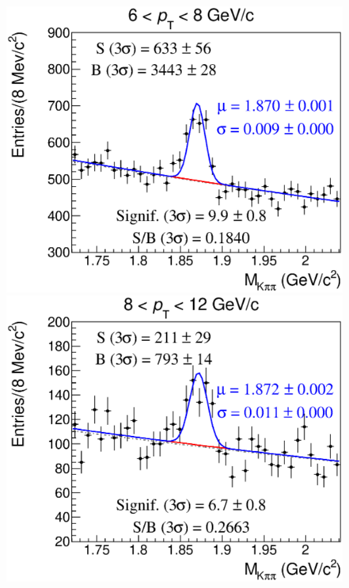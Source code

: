 \documentclass[b5paper,10pt,twoside,oldstyle,classica]{toptesi}
\begin{document}
\begin{figure}[h]
\begin{center}
{\includegraphics[scale = 0.25]{MassFitSet1_Pt4.eps}}
\hspace{0cm}
{\includegraphics[scale = 0.25]{MassFitSet1_Pt5.eps}}
\vspace{0cm}

\end{center}
\end{figure}
\end{document}
